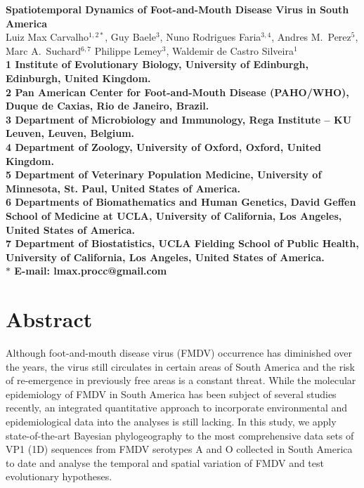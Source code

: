 \documentclass[10pt]{article}
\date{}
\begin{document}
\begin{flushleft}
{\Large
\textbf{Spatiotemporal Dynamics of Foot-and-Mouth Disease Virus in South America}
}
\\
Luiz Max Carvalho$^{1,2\ast}$,
Guy Baele$^{3}$,
Nuno Rodrigues Faria$^{3,4}$,
Andres M.~Perez$^{5}$,
Marc A.~Suchard$^{6,7}$
Philippe Lemey$^{3}$,
Waldemir de Castro Silveira$^{1}$
\\
\bf{1} Institute of Evolutionary Biology, University of Edinburgh, Edinburgh, United Kingdom.
\\
\bf{2} Pan American Center for Foot-and-Mouth Disease (PAHO/WHO), Duque de Caxias, Rio de Janeiro, Brazil.
\\
\bf{3} Department of Microbiology and Immunology, Rega Institute -- KU Leuven, Leuven, Belgium.
\\
\bf{4} Department of Zoology, University of Oxford, Oxford, United Kingdom.
\\
\bf{5} Department of Veterinary Population Medicine, University of Minnesota, St. Paul, United States of America.
\\
\bf{6} Departments of Biomathematics and Human Genetics, David Geffen School of Medicine at UCLA, University of California, Los Angeles,  United States of America.\\
\bf{7} Department of Biostatistics, UCLA Fielding School of Public Health, University of California, Los Angeles,  United States of America.
\\
$\ast$ E-mail: lmax.procc@gmail.com
\end{flushleft}
\section*{Abstract}

Although foot-and-mouth disease virus (FMDV) occurrence has diminished over the years, the virus still circulates in certain areas of South America and the risk of re-emergence in previously free areas is a constant threat.
While the molecular epidemiology of FMDV in South America has been subject of several studies recently, an integrated quantitative approach to incorporate environmental and epidemiological data into the analyses is still lacking.
In this study, we apply state-of-the-art Bayesian phylogeography to the most comprehensive data sets of VP1 (1D) sequences from FMDV serotypes A and O collected in South America to date and analyse the temporal and spatial variation of FMDV and test evolutionary hypotheses.
\end{document}
